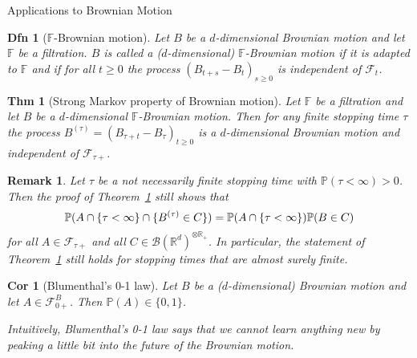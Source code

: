 \documentclass[a4paper]{article}
\theoremstyle{mytheoremstyle}
\newtheorem{definition}{Dfn}
\newtheorem{theorem}{Thm}
\newtheorem{corollary}{Cor}[theorem]
\newtheorem*{remark}{Remark}
\newcommand{\1}{\mathds{1}}
\begin{document}
\begin{multicols*}{3}
\begin{roundbox}{Applications to Brownian Motion}
\begin{definition}[$\mathbb{F}$-Brownian motion]
  Let $B$ be a $d$-dimensional Brownian motion and let $\mathbb{F}$ be a
  filtration. $B$ is called a ($d$-dimensional) $\mathbb{F}$-Brownian motion if
  it is adapted to $\mathbb{F}$ and if for all $t \geqslant 0$ the process
  $(B_{t + s} - B_t)_{s \geqslant 0}$ is independent of $\mathcal{F}_t$.
\end{definition}

\begin{theorem}[Strong Markov property of Brownian motion]
  \label{thm:strong Markov}Let $\mathbb{F}$ be a filtration and let $B$ be a
  $d$-dimensional $\mathbb{F}$-Brownian motion. Then for any finite stopping
  time $\tau$ the process $B^{(\tau)} = (B_{\tau + t} - B_{\tau})_{t \geqslant
  0}$ is a $d$-dimensional Brownian motion and independent of
  $\mathcal{F}_{\tau +}$.
\end{theorem}

\begin{remark}
  Let $\tau$ be a not necessarily finite stopping time with $\mathbb{P} (\tau
  < \infty) > 0$. Then the proof of Theorem~\ref{thm:strong Markov} still
  shows that
  \vspace{-0.5em}
  \[
    \mathbb{P} (A \cap \{\tau < \infty\} \cap \{ B^{(\tau)} \in C \})
     =\mathbb{P} (A \cap \{\tau < \infty\}) \mathbb{P} (B \in C)
  \vspace{-0.5em}
   \]
  for all $A \in \mathcal{F}_{\tau +}$ and all $C \in \mathcal{B}
  (\mathbb{R}^d)^{\otimes \mathbb{R}_+}$. In particular, the
  statement of Theorem~\ref{thm:strong Markov} still holds for stopping times
  that are almost surely finite.
\end{remark}
\end{roundbox}

\begin{unlabeledbox}
\begin{corollary}[Blumenthal's 0-1 law]
  \label{cor:blumenthal}Let $B$ be a ($d$-dimensional) Brownian motion and let
  $A \in \mathcal{F}_{0 +}^B$. Then $\mathbb{P} (A) \in \{ 0, 1 \}$.

  Intuitively, Blumenthal's 0-1 law says that we cannot learn anything new by
  peaking a little bit into the future of the Brownian motion.
\end{corollary}


\end{unlabeledbox}
\end{multicols*}
\end{document}
